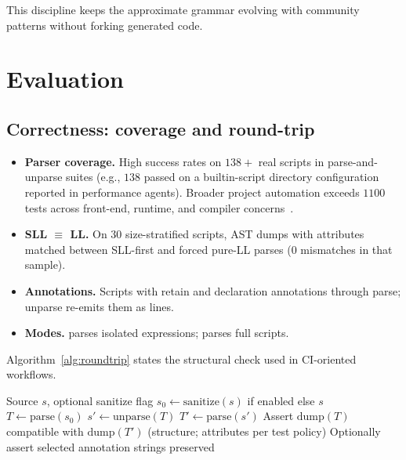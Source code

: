 \documentclass[11pt,a4paper]{article}
\begin{document}
This discipline keeps the approximate grammar evolving with community patterns
without forking generated code.

\section{Evaluation}
\label{sec:eval}

\subsection{Correctness: coverage and round-trip}
\label{sec:eval-correct}

\begin{itemize}[leftmargin=*]
  \item \textbf{Parser coverage.}
    High success rates on \(138+\) real scripts in parse-and-unparse suites
    (e.g., \(138\) passed on a builtin-script directory configuration reported
    in performance agents). Broader project automation exceeds \(1100\) tests
    across front-end, runtime, and compiler concerns~\citep{pynescript2026}.
  \item \textbf{SLL \(\equiv\) LL.}
    On \(30\) size-stratified scripts, AST dumps with attributes matched between
    SLL-first and forced pure-LL parses (\(0\) mismatches in that sample).
  \item \textbf{Annotations.}
    Scripts with  retain  and declaration
    annotations through parse; unparse re-emits them as lines.
  \item \textbf{Modes.}
     parses isolated expressions;  parses
    full scripts.
\end{itemize}

Algorithm~\ref{alg:roundtrip} states the structural check used in CI-oriented
workflows.

\begin{algorithm}[t]
\caption{RoundTripCheck}
\label{alg:roundtrip}
\begin{algorithmic}[1]
\Require Source \(s\), optional sanitize flag
\State \(s_0 \gets \mathrm{sanitize}(s)\) if enabled else \(s\)
\State \(T \gets \mathrm{parse}(s_0)\)
\State \(s' \gets \mathrm{unparse}(T)\)
\State \(T' \gets \mathrm{parse}(s')\)
\State Assert \(\mathrm{dump}(T)\) compatible with \(\mathrm{dump}(T')\)
        (structure; attributes per test policy)
\State Optionally assert selected annotation strings preserved
\end{algorithmic}
\end{algorithm}
\end{document}
